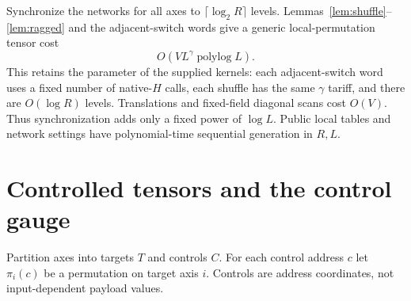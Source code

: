 \documentclass[11pt]{article}
\newcommand{\polylog}{\operatorname{polylog}}
\begin{document}
Synchronize the networks for all axes to $\lceil\log_2R\rceil$ levels.
Lemmas~\ref{lem:shuffle}--\ref{lem:ragged} and the adjacent-switch
words give a generic local-permutation tensor cost
\begin{equation}
 \label{eq:generic}
 O(VL^\gamma\polylog L).
\end{equation}
This retains the parameter of the supplied kernels: each adjacent-switch
word uses a fixed number of native-$H$ calls, each shuffle has the
same $\gamma$ tariff, and there are $O(\log R)$ levels. Translations
and fixed-field diagonal scans cost $O(V)$. Thus synchronization adds
only a fixed power of $\log L$. Public local tables and network
settings have polynomial-time sequential generation in $R,L$.

\section{Controlled tensors and the control gauge}

Partition axes into targets $T$ and controls $C$. For each control
address $c$ let $\pi_i(c)$ be a permutation on target axis $i$.
Controls are address coordinates, not input-dependent payload values.
\end{document}
